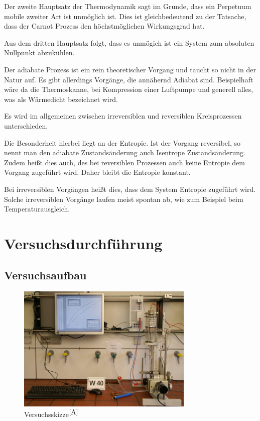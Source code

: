 \documentclass[fontsize=12pt]{scrartcl}
\begin{document}
Der zweite Hauptsatz der Thermodynamik sagt im Grunde, dass ein  Perpetuum mobile zweiter Art ist unmöglich ist. Dies ist gleichbedeutend zu der Tatsache, dass der Carnot Prozess den höchstmöglichen Wirkungsgrad hat. \par

Aus dem dritten Hauptsatz folgt, dass es unmögich ist ein System zum absoluten Nullpunkt abzukühlen.

Der adiabate Prozess ist ein rein theoretischer Vorgang und taucht so nicht in der Natur auf. Es gibt allerdings Vorgänge, die annähernd Adiabat sind. Beispielhaft wäre da die Thermoskanne, bei Kompression einer Luftpumpe und generell alles, was als \glqq Wärmedicht \grqq bezeichnet wird. \par

Es wird im allgemeinen zwischen irreversiblen und reversiblen Kreisprozessen unterschieden. \par

Die Besonderheit hierbei liegt an der Entropie. Ist der Vorgang reversibel, so nennt man den adiabate Zustandsänderung auch Isentrope Zustandsänderung. Zudem heißt dies auch, des bei reversiblen Prozessen auch keine Entropie dem Vorgang zugeführt wird. Daher bleibt die Entropie konstant. \par

Bei irreversiblen Vorgängen heißt dies, dass dem System Entropie zugeführt wird. Solche irreversiblen Vorgänge laufen meist spontan ab, wie zum Beispiel beim Temperaturausgleich.
\newpage

\section{Versuchsdurchführung}

\subsection{ Versuchsaufbau}

\begin{figure}[H]
\centering
\includegraphics[width=0.75\textwidth]{Graphik/W40}
\caption{Versuchsskizze$^{\cite{A}}$}
\end{figure}
\end{document}
